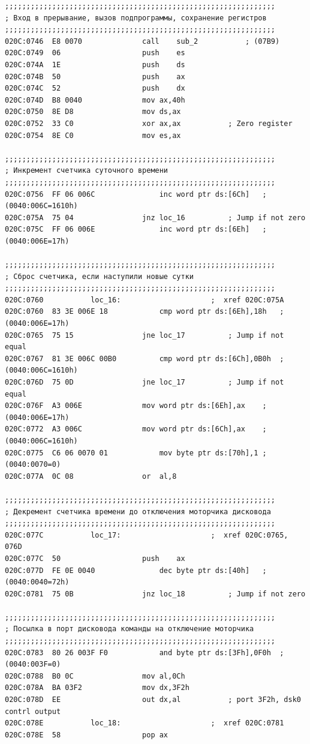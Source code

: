 ﻿\documentclass[a4paper,12pt]{article}
\begin{document}
    \begin{lstlisting}
;;;;;;;;;;;;;;;;;;;;;;;;;;;;;;;;;;;;;;;;;;;;;;;;;;;;;;;;;;;;;;;
; Вход в прерывание, вызов подпрограммы, сохранение регистров
;;;;;;;;;;;;;;;;;;;;;;;;;;;;;;;;;;;;;;;;;;;;;;;;;;;;;;;;;;;;;;;
020C:0746  E8 0070				call	sub_2			; (07B9)
020C:0749  06					push	es
020C:074A  1E					push	ds
020C:074B  50					push	ax
020C:074C  52					push	dx
020C:074D  B8 0040				mov	ax,40h
020C:0750  8E D8				mov	ds,ax
020C:0752  33 C0				xor	ax,ax			; Zero register
020C:0754  8E C0				mov	es,ax

;;;;;;;;;;;;;;;;;;;;;;;;;;;;;;;;;;;;;;;;;;;;;;;;;;;;;;;;;;;;;;;
; Инкремент счетчика суточного времени
;;;;;;;;;;;;;;;;;;;;;;;;;;;;;;;;;;;;;;;;;;;;;;;;;;;;;;;;;;;;;;;
020C:0756  FF 06 006C				inc	word ptr ds:[6Ch]	; (0040:006C=1610h)
020C:075A  75 04				jnz	loc_16			; Jump if not zero
020C:075C  FF 06 006E				inc	word ptr ds:[6Eh]	; (0040:006E=17h)

;;;;;;;;;;;;;;;;;;;;;;;;;;;;;;;;;;;;;;;;;;;;;;;;;;;;;;;;;;;;;;;
; Сброс счетчика, если наступили новые сутки
;;;;;;;;;;;;;;;;;;;;;;;;;;;;;;;;;;;;;;;;;;;;;;;;;;;;;;;;;;;;;;;
020C:0760			loc_16:						;  xref 020C:075A
020C:0760  83 3E 006E 18			cmp	word ptr ds:[6Eh],18h	; (0040:006E=17h)
020C:0765  75 15				jne	loc_17			; Jump if not equal
020C:0767  81 3E 006C 00B0			cmp	word ptr ds:[6Ch],0B0h	; (0040:006C=1610h)
020C:076D  75 0D				jne	loc_17			; Jump if not equal
020C:076F  A3 006E				mov	word ptr ds:[6Eh],ax	; (0040:006E=17h)
020C:0772  A3 006C				mov	word ptr ds:[6Ch],ax	; (0040:006C=1610h)
020C:0775  C6 06 0070 01			mov	byte ptr ds:[70h],1	; (0040:0070=0)
020C:077A  0C 08				or	al,8

;;;;;;;;;;;;;;;;;;;;;;;;;;;;;;;;;;;;;;;;;;;;;;;;;;;;;;;;;;;;;;;
; Декремент счетчика времени до отключения моторчика дисковода
;;;;;;;;;;;;;;;;;;;;;;;;;;;;;;;;;;;;;;;;;;;;;;;;;;;;;;;;;;;;;;;
020C:077C			loc_17:						;  xref 020C:0765, 076D
020C:077C  50					push	ax
020C:077D  FE 0E 0040				dec	byte ptr ds:[40h]	; (0040:0040=72h)
020C:0781  75 0B				jnz	loc_18			; Jump if not zero

;;;;;;;;;;;;;;;;;;;;;;;;;;;;;;;;;;;;;;;;;;;;;;;;;;;;;;;;;;;;;;;
; Посылка в порт дисковода команды на отключение моторчика
;;;;;;;;;;;;;;;;;;;;;;;;;;;;;;;;;;;;;;;;;;;;;;;;;;;;;;;;;;;;;;;
020C:0783  80 26 003F F0			and	byte ptr ds:[3Fh],0F0h	; (0040:003F=0)
020C:0788  B0 0C				mov	al,0Ch
020C:078A  BA 03F2				mov	dx,3F2h
020C:078D  EE					out	dx,al			; port 3F2h, dsk0 contrl output
020C:078E			loc_18:						;  xref 020C:0781
020C:078E  58					pop	ax


\end{lstlisting}
\end{document}

